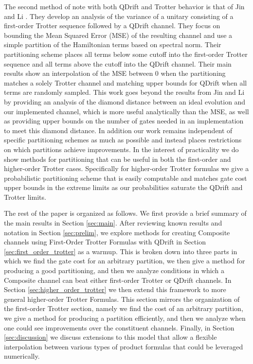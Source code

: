 The second method of note with both QDrift and Trotter behavior is that of Jin and Li \cite{jin2021partially}. They develop an analysis of the variance of a unitary consisting of a first-order Trotter sequence followed by a QDrift channel. They focus on bounding the Mean Squared Error (MSE) of the resulting channel and use a simple partition of the Hamiltonian terms based on spectral norm. Their partitioning scheme places all terms below some cutoff into the first-order Trotter sequence and all terms above the cutoff into the QDrift channel. Their main results show an interpolation of the MSE between 0 when the partitioning matches a solely Trotter channel and matching upper bounds for QDrift when all terms are randomly sampled. This work goes beyond the results from Jin and Li by providing an analysis of the diamond distance between an ideal evolution and our implemented channel, which is more useful analytically than the MSE, as well as providing upper bounds on the number of gates needed in an implementation to meet this diamond distance. In addition our work remains independent of specific partitioning schemes as much as possible and instead places restrictions on which partitions achieve improvements. In the interest of practicality we do show methods for partitioning that can be useful in both the first-order and higher-order Trotter cases. Specifically for higher-order Trotter formulas we give a probabilistic partitioning scheme that is easily computable and matches gate cost upper bounds in the extreme limits as our probabilities saturate the QDrift and Trotter limits. 

The rest of the paper is organized as follows. We first provide a brief summary of the main results in Section \ref{sec:main}. After reviewing known results and notation in Section \ref{sec:prelim}, we explore methods for creating Composite channels using First-Order Trotter Formulas with QDrift in Section \ref{sec:first_order_trotter} as a warmup. This is broken down
into three parts in which we find the gate cost for an arbitrary partition, we then give a method for producing a good partitioning, and then we analyze conditions in which a Composite channel can beat either first-order Trotter or QDrift channels. In Section \ref{sec:higher_order_trotter} we then extend this framework to more general higher-order Trotter Formulas. This section mirrors the organization of the first-order Trotter section,
namely we find the cost of an arbitrary partition, we give a method for producing a partition efficiently, and then we analyze when one could see
improvements over the constituent channels. Finally, in Section \ref{sec:discussion} we discuss extensions to this model that allow a flexible interpolation between various types of product formulas that could be leveraged numerically. 

